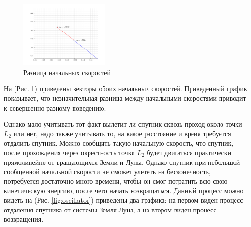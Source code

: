 \documentclass[a4paper,12pt]{article}
\begin{document}
\begin{figure}
	\vspace{-20pt}
	\begin{center}
    	\includegraphics[width=0.40\textwidth]{../../img/sim_r3bp_v0_in-outside.png}
	\end{center}
	\vspace{-20pt}
	\caption{Разница начальных скоростей}
	\label{fig:sim_r3bp_v0_in-outside}
    \vspace{10pt}
\end{figure}
На (Рис. \ref{fig:sim_r3bp_v0_in-outside}) приведены векторы обоих начальных скоростей. Приведенный график показывает, что незначительная разница между начальными скоростями приводит к совершенно разному поведению.

Однако мало учитывать тот факт вылетит ли спутник сквозь проход около точки $L_2$ или нет, надо также учитывать то, на какое расстояние и вреия требуется отдалить спутник. Можно сообщить такую начальную скорость, что спутник, после прохождения через окрестность точки $L_2$ будет двигаться практически прямолинейно от вращающихся Земли и Луны. Однако спутник при небольшой сообщенной начальной скорости не сможет улететь на бесконечность, потребуется достаточно много времени, чтобы он смог потратить всю свою кинетическую энергию, после чего начать возвращаться. Данный процесс можно видеть на (Рис. \ref{fig:oscillator}) приведены два графика: на первом виден процесс отдаления спутника от системы Земля-Луна, а на втором виден процесс возвращения.
\end{document}

